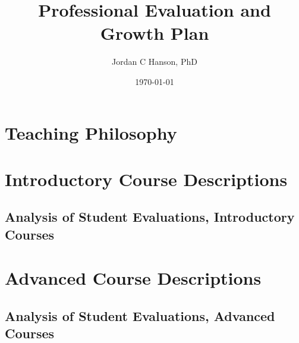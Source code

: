 \documentclass[10pt,oneside]{book}
\title{Professional Evaluation and Growth Plan}
\author{Jordan C Hanson, PhD}
\date{\today}
\begin{document}
\maketitle
\tableofcontents

\section{Teaching Philosophy}

\begin{flushleft}

\end{flushleft}

\section{Introductory Course Descriptions}

\begin{flushleft}

\end{flushleft}

\clearpage

\subsection{Analysis of Student Evaluations, Introductory Courses}

\begin{flushleft}

\end{flushleft}

\clearpage

\section{Advanced Course Descriptions}

\begin{flushleft}

\end{flushleft}

\clearpage

\subsection{Analysis of Student Evaluations, Advanced Courses}

\begin{flushleft}

\end{flushleft}



\end{document}
